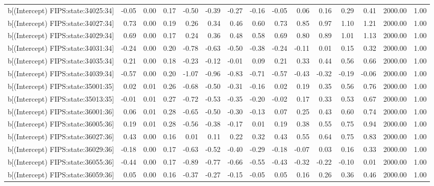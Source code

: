 \begin{table}[ht]
\begin{tabular}{rrrrrrrrrrrrrrr}
  b[(Intercept) FIPS:state:34025:34] & -0.05 & 0.00 & 0.17 & -0.50 & -0.39 & -0.27 & -0.16 & -0.05 & 0.06 & 0.16 & 0.29 & 0.41 & 2000.00 & 1.00 \\ 
  b[(Intercept) FIPS:state:34027:34] & 0.73 & 0.00 & 0.19 & 0.26 & 0.34 & 0.46 & 0.60 & 0.73 & 0.85 & 0.97 & 1.10 & 1.21 & 2000.00 & 1.00 \\ 
  b[(Intercept) FIPS:state:34029:34] & 0.69 & 0.00 & 0.17 & 0.24 & 0.36 & 0.48 & 0.58 & 0.69 & 0.80 & 0.89 & 1.01 & 1.13 & 2000.00 & 1.00 \\ 
  b[(Intercept) FIPS:state:34031:34] & -0.24 & 0.00 & 0.20 & -0.78 & -0.63 & -0.50 & -0.38 & -0.24 & -0.11 & 0.01 & 0.15 & 0.32 & 2000.00 & 1.00 \\ 
  b[(Intercept) FIPS:state:34035:34] & 0.21 & 0.00 & 0.18 & -0.23 & -0.12 & -0.01 & 0.09 & 0.21 & 0.33 & 0.44 & 0.56 & 0.66 & 2000.00 & 1.00 \\ 
  b[(Intercept) FIPS:state:34039:34] & -0.57 & 0.00 & 0.20 & -1.07 & -0.96 & -0.83 & -0.71 & -0.57 & -0.43 & -0.32 & -0.19 & -0.06 & 2000.00 & 1.00 \\ 
  b[(Intercept) FIPS:state:35001:35] & 0.02 & 0.01 & 0.26 & -0.68 & -0.50 & -0.31 & -0.16 & 0.02 & 0.19 & 0.35 & 0.56 & 0.76 & 2000.00 & 1.00 \\ 
  b[(Intercept) FIPS:state:35013:35] & -0.01 & 0.01 & 0.27 & -0.72 & -0.53 & -0.35 & -0.20 & -0.02 & 0.17 & 0.33 & 0.53 & 0.67 & 2000.00 & 1.00 \\ 
  b[(Intercept) FIPS:state:36001:36] & 0.06 & 0.01 & 0.28 & -0.65 & -0.50 & -0.30 & -0.13 & 0.07 & 0.25 & 0.43 & 0.60 & 0.74 & 2000.00 & 1.00 \\ 
  b[(Intercept) FIPS:state:36005:36] & 0.19 & 0.01 & 0.28 & -0.56 & -0.38 & -0.17 & 0.01 & 0.19 & 0.38 & 0.55 & 0.75 & 0.94 & 2000.00 & 1.00 \\ 
  b[(Intercept) FIPS:state:36027:36] & 0.43 & 0.00 & 0.16 & 0.01 & 0.11 & 0.22 & 0.32 & 0.43 & 0.55 & 0.64 & 0.75 & 0.83 & 2000.00 & 1.00 \\ 
  b[(Intercept) FIPS:state:36029:36] & -0.18 & 0.00 & 0.17 & -0.63 & -0.52 & -0.40 & -0.29 & -0.18 & -0.07 & 0.03 & 0.16 & 0.33 & 2000.00 & 1.00 \\ 
  b[(Intercept) FIPS:state:36055:36] & -0.44 & 0.00 & 0.17 & -0.89 & -0.77 & -0.66 & -0.55 & -0.43 & -0.32 & -0.22 & -0.10 & 0.01 & 2000.00 & 1.00 \\ 
  b[(Intercept) FIPS:state:36059:36] & 0.05 & 0.00 & 0.16 & -0.37 & -0.27 & -0.15 & -0.05 & 0.05 & 0.16 & 0.26 & 0.36 & 0.46 & 2000.00 & 1.00 \\ 

\end{tabular}
\end{table}
